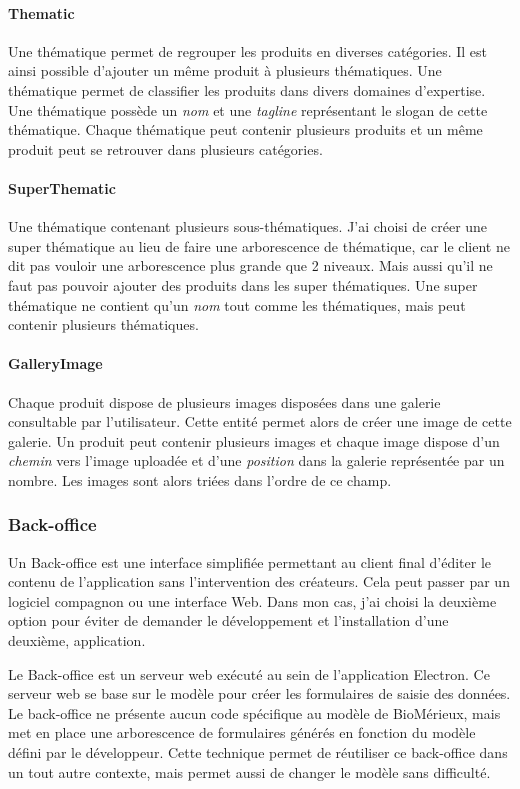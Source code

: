 \paragraph{Thematic} Une thématique permet de regrouper les produits en diverses catégories.
Il est ainsi possible d'ajouter un même produit à plusieurs thématiques.
Une thématique permet de classifier les produits dans divers domaines d'expertise.
Une thématique possède un \emph{nom} et une \emph{tagline} représentant le slogan de cette thématique.
Chaque thématique peut contenir plusieurs produits et un même produit peut se retrouver dans plusieurs catégories.

\paragraph{SuperThematic} Une thématique contenant plusieurs sous-thématiques.
J'ai choisi de créer une super thématique au lieu de faire une arborescence de thématique, car le client ne dit pas vouloir une arborescence plus grande que 2 niveaux.
Mais aussi qu'il ne faut pas pouvoir ajouter des produits dans les super thématiques.
Une super thématique ne contient qu'un \emph{nom} tout comme les thématiques, mais peut contenir plusieurs thématiques.

\paragraph{GalleryImage} Chaque produit dispose de plusieurs images disposées dans une galerie consultable par l'utilisateur.
Cette entité permet alors de créer une image de cette galerie.
Un produit peut contenir plusieurs images et chaque image dispose d'un \emph{chemin} vers l'image uploadée et d'une \emph{position} dans la galerie représentée par un nombre.
Les images sont alors triées dans l'ordre de ce champ.

\subsubsection{Back-office}

Un Back-office est une interface simplifiée permettant au client final d'éditer le contenu de l'application sans l'intervention des créateurs.
Cela peut passer par un logiciel compagnon ou une interface Web.
Dans mon cas, j'ai choisi la deuxième option pour éviter de demander le développement et l'installation d'une deuxième, application.

Le Back-office est un serveur web exécuté au sein de l'application Electron.
Ce serveur web se base sur le modèle pour créer les formulaires de saisie des données.
Le back-office ne présente aucun code spécifique au modèle de BioMérieux, mais met en place une arborescence de formulaires générés en fonction du modèle défini par le développeur.
Cette technique permet de réutiliser ce back-office dans un tout autre contexte, mais permet aussi de changer le modèle sans difficulté.

